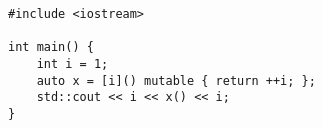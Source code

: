 \begin{lstlisting}[title=\href{https://godbolt.org/z/M8Pjjb}{\texttt{godbolt.org/z/M8Pjjb}}]
#include <iostream>

int main() {
    int i = 1;
    auto x = [i]() mutable { return ++i; };
    std::cout << i << x() << i;
}
\end{lstlisting}
